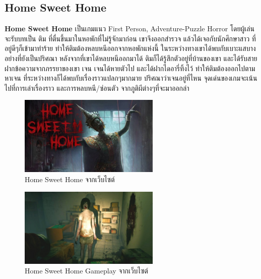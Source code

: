 \subsection{Home Sweet Home}
\subsubitem \textbf{Home Sweet Home} \cite{home-sweet-home:theory} เป็นเกมแนว First Person, Adventure-Puzzle Horror โดยผู้เล่นจะรับบทเป็น ติม ที่ตื่นขึ้นมาในหอพักที่ไม่รู้จักมาก่อน เขาจึงออกสำรวจ แล้วได้เจอกับนักศึกษาสาว ที่อยู่ดีๆก็เข้ามาทำร้าย ทำให้ติมต้องหลบหนีออกจากหอพักแห่งนี้ ในระหว่างทางเขาได้พบกับเบาะแสบางอย่างที่ยังเป็นปริศณา หลังจากที่เขาได้หลบหนีออกมาได้ ติมก็ได้รู้สึกตัวอยู่ที่บ้านของเขา และได้รับสายฝากข้อความจากภรรยาของเขา เจน เจนได้หายตัวไป และได้ฝากไดอารี่ทิ้งไว้ ทำให้ติมต้องออกไปตามหาเจน ที่ระหว่างทางก็ได้พบกับเรื่องราวแปลกๆมากมาย ปริศณาว่าเจนอยู่ที่ไหน จุดเด่นของเกมจะเน้นไปที่การเล่าเรื่องราว และการหลบหนี/ซ่อนตัว จากภูติผีต่างๆที่จะมาออกล่า
\begin{figure}[h]
  \centering
  \includegraphics[width=0.6\textwidth, height=0.2\textheight]{Images/800px-HomeSweetHomePoster1.jpg}
  \caption{Home Sweet Home จากเว็บไซต์}\label{HomeSweetHomePoster1}
\end{figure}

\begin{figure}[h]
  \centering
  \includegraphics[width=0.6\textwidth, height=0.2\textheight]{Images/maxresdefault.jpg}
  \caption{Home Sweet Home Gameplay จากเว็บไซต์}\label{HomeSweetHomeWalkthrough}
\end{figure}

